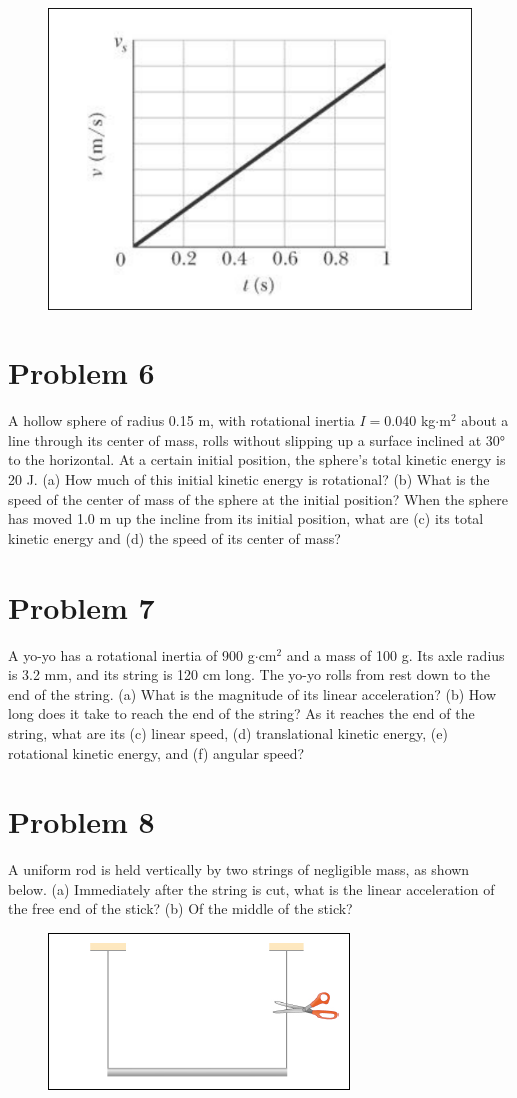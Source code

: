 \documentclass{article}
\begin{document}
\begin{figure}[ht]
    \centering
    \includegraphics[scale=0.4]{drawing-2.png}
\end{figure}

\section*{Problem 6}
A hollow sphere of radius 0.15 m, with rotational inertia $I = 0.040$ kg$\cdot$m$^2$ about a line through its center of
mass, rolls without slipping up a surface inclined at 30° to the horizontal. At a certain initial position, the sphere’s
total kinetic energy is 20 J. (a) How much of this initial kinetic energy is rotational? (b) What is the speed of the
center of mass of the sphere at the initial position? When the sphere has moved 1.0 m up the incline from its
initial position, what are (c) its total kinetic energy and (d) the speed of its center of mass?

\section*{Problem 7}
A yo-yo has a rotational inertia of 900 g$\cdot$cm$^2$ and a mass of 100 g. Its axle radius is 3.2 mm, and its string is
120 cm long. The yo-yo rolls from rest down to the end of the string. (a) What is the magnitude of its linear
acceleration? (b) How long does it take to reach the end of the string? As it reaches the end of the string, what are
its (c) linear speed, (d) translational kinetic energy, (e) rotational kinetic energy, and (f) angular speed?

\section*{Problem 8}
A uniform rod is held vertically by two strings of negligible mass, as shown below. (a) Immediately after the
string is cut, what is the linear acceleration of the free end of the stick? (b) Of the middle of the stick?

\begin{figure}[ht]
    \centering
    \includegraphics[scale=0.6]{drawing-3.png}
\end{figure}
\end{document}
